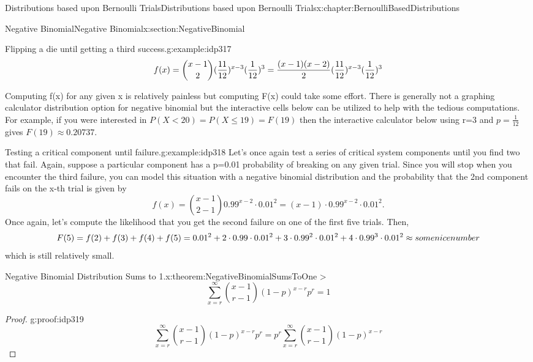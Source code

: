 \documentclass[oneside,10pt,]{book}
\numberwithin{equation}{section}
\newcommand{\lt}{<}
\begin{document}
\begin{chapterptx}{Distributions based upon Bernoulli Trials}{}{Distributions based upon Bernoulli Trials}{}{}{x:chapter:BernoulliBasedDistributions}
\begin{sectionptx}{Negative Binomial}{}{Negative Binomial}{}{}{x:section:NegativeBinomial}
\begin{example}{Flipping a die until getting a third success.}{g:example:idp317}
\begin{equation*}
f(x) = \binom{x-1}{2}(\frac{11}{12})^{x-3} (\frac{1}{12})^3  \\
= \frac{(x-1)(x-2)}{2}(\frac{11}{12})^{x-3} (\frac{1}{12})^3
\end{equation*}
%
\par
Computing f(x) for any given x is relatively painless but computing F(x) could take some effort. There is generally not a graphing calculator distribution option for negative binomial but the interactive cells below can be utilized to help with the tedious computations. For example, if you were interested in \(P(X \lt 20) = P(X \le 19 ) = F(19)\) then the interactive calculator below using r=3 and \(p = \frac{1}{12}\) gives \(F(19) \approx 0.20737.\)%
\end{example}
\begin{example}{Testing a critical component until failure.}{g:example:idp318}%
Let's once again test a series of critical system components until you find two that fail. Again, suppose a particular component has a p=0.01 probability of breaking on any given trial. Since you will stop when you encounter the third failure, you can model this situation with a negative binomial distribution and the probability that the 2nd component fails on the x-th trial is given by%
\begin{equation*}
f(x) = \binom{x-1}{2-1} 0.99^{x-2} \cdot 0.01^2 = (x-1) \cdot 0.99^{x-2} \cdot 0.01^2.
\end{equation*}
Once again, let's compute the likelihood that you get the second failure on one of the first five trials. Then,%
\begin{equation*}
F(5) = f(2)+f(3)+f(4)+f(5) \\ = 0.01^2 + 2 \cdot 0.99 \cdot 0.01^2 + 3 \cdot 0.99^2 \cdot 0.01^2 + 4 \cdot 0.99^3 \cdot 0.01^2 \approx some nice number
\end{equation*}
which is still relatively small.%
\end{example}
\begin{theorem}{Negative Binomial Distribution Sums to 1.}{}{x:theorem:NegativeBinomialSumsToOne}%
\textgreater{} %
\begin{equation*}
\sum_{x=r}^{\infty} {\binom{x - 1}{r-1}(1-p)^{x-r}p^r} = 1
\end{equation*}
%
\end{theorem}
\begin{proof}{}{g:proof:idp319}
%
\begin{equation*}
\sum_{x=r}^{\infty} {\binom{x - 1}{r-1}(1-p)^{x-r}p^r} = p^r \sum_{x=r}^{\infty} {\binom{x - 1}{r-1}(1-p)^{x-r}}

\end{equation*}
\end{proof}
\end{sectionptx}
\end{chapterptx}
\end{document}
